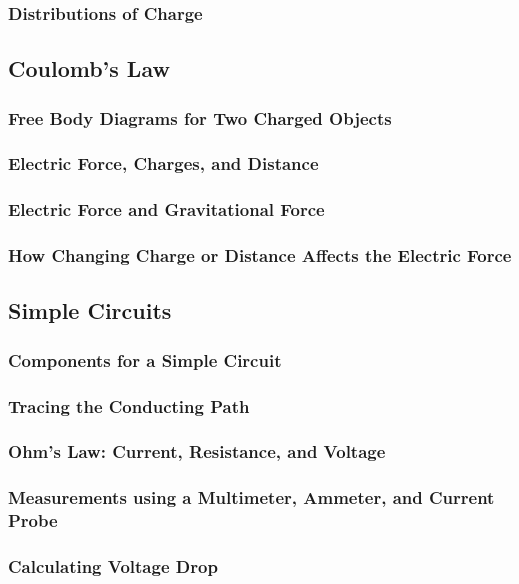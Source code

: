 \documentclass[../main-physics-problems.tex]{subfiles}
\begin{document}
\subsubsection{Distributions of Charge}

\clearpage

\subsection{Coulomb’s Law}
\subsubsection{Free Body Diagrams for Two Charged Objects}
\subsubsection{Electric Force, Charges, and Distance}
\subsubsection{Electric Force and Gravitational Force}
\subsubsection{How Changing Charge or Distance Affects the Electric Force}

\clearpage

\subsection{Simple Circuits}
\subsubsection{Components for a Simple Circuit}
\subsubsection{Tracing the Conducting Path}
\subsubsection{Ohm’s Law: Current, Resistance, and Voltage}
\subsubsection{Measurements using a Multimeter, Ammeter, and Current Probe}
\subsubsection{Calculating Voltage Drop}
\end{document}

